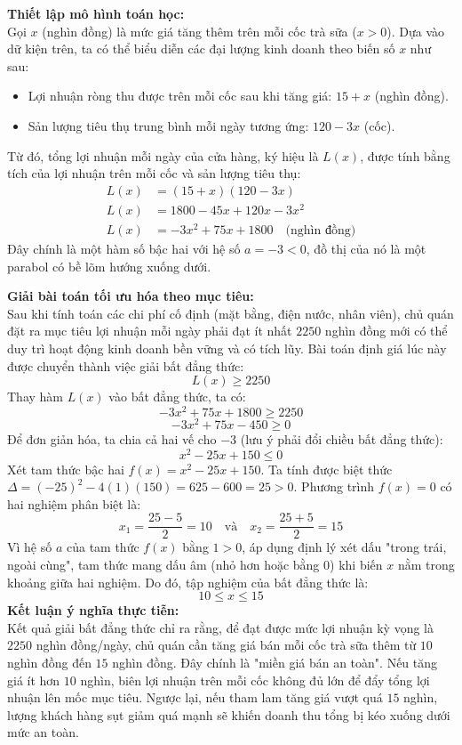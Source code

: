 \documentclass[14pt, a4paper, oneside]{extreport}
\begin{document}
\textbf{Thiết lập mô hình toán học:} \\
Gọi $x$ (nghìn đồng) là mức giá tăng thêm trên mỗi cốc trà sữa ($x > 0$). Dựa vào dữ kiện trên, ta có thể biểu diễn các đại lượng kinh doanh theo biến số $x$ như sau:
\begin{itemize}
    \item Lợi nhuận ròng thu được trên mỗi cốc sau khi tăng giá: $15 + x$ (nghìn đồng).
    \item Sản lượng tiêu thụ trung bình mỗi ngày tương ứng: $120 - 3x$ (cốc).
\end{itemize}
Từ đó, tổng lợi nhuận mỗi ngày của cửa hàng, ký hiệu là $L(x)$, được tính bằng tích của lợi nhuận trên mỗi cốc và sản lượng tiêu thụ:
\begin{align*}
    L(x) &= (15 + x)(120 - 3x) \\
    L(x) &= 1800 - 45x + 120x - 3x^2 \\
    L(x) &= -3x^2 + 75x + 1800 \quad \text{(nghìn đồng)}
\end{align*}
Đây chính là một hàm số bậc hai với hệ số $a = -3 < 0$, đồ thị của nó là một parabol có bề lõm hướng xuống dưới.

\textbf{Giải bài toán tối ưu hóa theo mục tiêu:} \\
Sau khi tính toán các chi phí cố định (mặt bằng, điện nước, nhân viên), chủ quán đặt ra mục tiêu lợi nhuận mỗi ngày phải đạt ít nhất $2250$ nghìn đồng mới có thể duy trì hoạt động kinh doanh bền vững và có tích lũy. Bài toán định giá lúc này được chuyển thành việc giải bất đẳng thức:
\[ L(x) \ge 2250 \]
Thay hàm $L(x)$ vào bất đẳng thức, ta có:
\[ -3x^2 + 75x + 1800 \ge 2250 \]
\[ -3x^2 + 75x - 450 \ge 0 \]
Để đơn giản hóa, ta chia cả hai vế cho $-3$ (lưu ý phải đổi chiều bất đẳng thức):
\[ x^2 - 25x + 150 \le 0 \]
Xét tam thức bậc hai $f(x) = x^2 - 25x + 150$. Ta tính được biệt thức $\Delta = (-25)^2 - 4(1)(150) = 625 - 600 = 25 > 0$. Phương trình $f(x) = 0$ có hai nghiệm phân biệt là:
\[ x_1 = \frac{25 - 5}{2} = 10 \quad \text{và} \quad x_2 = \frac{25 + 5}{2} = 15 \]
Vì hệ số $a$ của tam thức $f(x)$ bằng $1 > 0$, áp dụng định lý xét dấu "trong trái, ngoài cùng", tam thức mang dấu âm (nhỏ hơn hoặc bằng $0$) khi biến $x$ nằm trong khoảng giữa hai nghiệm. Do đó, tập nghiệm của bất đẳng thức là:
\[ 10 \le x \le 15 \]
\textbf{Kết luận ý nghĩa thực tiễn:} \\
Kết quả giải bất đẳng thức chỉ ra rằng, để đạt được mức lợi nhuận kỳ vọng là $2250$ nghìn đồng/ngày, chủ quán cần tăng giá bán mỗi cốc trà sữa thêm từ $10$ nghìn đồng đến $15$ nghìn đồng. Đây chính là "miền giá bán an toàn". Nếu tăng giá ít hơn $10$ nghìn, biên lợi nhuận trên mỗi cốc không đủ lớn để đẩy tổng lợi nhuận lên mốc mục tiêu. Ngược lại, nếu tham lam tăng giá vượt quá $15$ nghìn, lượng khách hàng sụt giảm quá mạnh sẽ khiến doanh thu tổng bị kéo xuống dưới mức an toàn.
\end{document}
